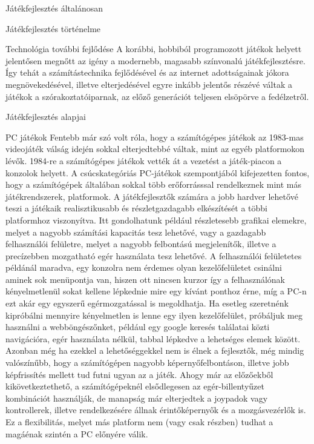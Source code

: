 \begin{MyChapter}{Játékfejlesztés általánosan}
\begin{MySection}{Játékfejlesztés történelme}
\begin{MySubSection}{Technológia további fejlődése}
			A korábbi, hobbiból programozott játékok helyett jelentősen megnőtt az igény a modernebb, magasabb színvonalú játékfejlesztésre. 
			Így tehát a számítástechnika fejlődésével és az internet adottságainak jókora megnövekedésével, illetve elterjedésével egyre inkább jelentős részévé váltak a játékok a szórakoztatóiparnak, az előző generációt teljesen elsöpörve a fedélzetről.
		\end{MySubSection}
				
	\end{MySection}

	\begin{MySection}{Játékfejlesztés alapjai} 
		
		\begin{MySubSection}{PC játékok}
			Fentebb már szó volt róla, hogy a számítógépes játékok az 1983-mas videojáték válság idején sokkal elterjedtebbé váltak, mint az egyéb platformokon lévők. 1984-re a számítógépes játékok vették át a vezetést a játék-piacon a konzolok helyett.
			\cite{pc_game}
			A csúcskategóriás PC-játékok szempontjából kifejezetten fontos, hogy a számítógépek általában sokkal több erőforrásssal rendelkeznek mint más játékrendszerek, platformok. A játékfejlesztők számára a jobb hardver lehetővé teszi a játékaik realisztikusabb és részletgazdagabb elkészítését a többi platformhoz viszonyítva. Itt gondolhatunk például részletesebb grafikai elemekre, melyet a nagyobb számítási kapacitás tesz lehetővé, vagy a gazdagabb felhasználói felületre, melyet a nagyobb felbontású megjelenítők, illetve a precízebben mozgatható egér használata tesz lehetővé. A felhasználói felületetes példánál maradva, egy konzolra nem érdemes olyan kezelőfelületet csinálni aminek sok menüpontja van, hiszen ott nincsen kurzor így a felhasználónak kényelmetlenül sokat kellene lépkednie mire egy kívánt ponthoz érne, míg a PC-n ezt akár egy egyszerű egérmozgatással is megoldhatja.
			Ha esetleg szeretnénk kipróbálni mennyire kényelmetlen is lenne egy ilyen kezelőfelület, próbáljuk meg használni a webböngészőnket, például egy google keresés találatai közti navigációra, egér használata nélkül, tabbal lépkedve a lehetséges elemek között.
			Azonban még ha ezekkel a lehetőséggekkel nem is élnek a fejlesztők, még mindig valószínűbb, hogy a számítógépen nagyobb képernyőfelbontáson, illetve jobb képfrissítés mellett tud futni ugyan az a játék.
			Ahogy már az előzőekből kikövetkeztethető, a számítógépeknél elsődlegesen az egér-billentyűzet kombinációt használják, de manapság már elterjedtek a joypadok vagy kontrollerek, illetve rendelkezésére állnak érintőképernyők és a mozgásvezérlők is. Ez a flexibilitás, melyet más platform nem (vagy csak részben) tudhat a magáénak szintén a PC előnyére válik. 
		\end{MySubSection}
	

\end{MySection}
\end{MyChapter}
